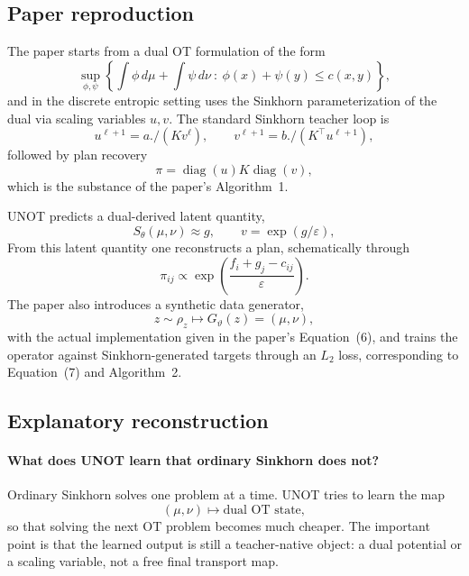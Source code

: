 \documentclass[11pt]{report}
\newcommand{\diag}{\operatorname{diag}}
\begin{document}
\subsection*{Paper reproduction}

The paper starts from a dual OT formulation of the form
\begin{equation}
\sup_{\phi,\psi}
\left\{
\int \phi\,d\mu + \int \psi\,d\nu
\ : \ \phi(x)+\psi(y)\le c(x,y)
\right\},
\label{eq:unot-dual-abstract}
\end{equation}
and in the discrete entropic setting uses the Sinkhorn parameterization of the dual
via scaling variables $u,v$.  The standard Sinkhorn teacher loop is
\begin{equation}
u^{\ell+1} = a ./ (K v^{\ell}),
\qquad
v^{\ell+1} = b ./ (K^{\top}u^{\ell+1}),
\label{eq:unot-sinkhorn}
\end{equation}
followed by plan recovery
\begin{equation}
\pi = \diag(u)K\diag(v),
\label{eq:unot-plan-from-scales}
\end{equation}
which is the substance of the paper's Algorithm~1.

UNOT predicts a dual-derived latent quantity,
\begin{equation}
S_\theta(\mu,\nu)\approx g,
\qquad
v = \exp(g/\varepsilon),
\label{eq:unot-dual-prediction}
\end{equation}
From this latent quantity one reconstructs a plan, schematically through
\begin{equation}
\pi_{ij} \propto \exp\!\left(\frac{f_i+g_j-c_{ij}}{\varepsilon}\right).
\label{eq:unot-plan-recovery}
\end{equation}
The paper also introduces a synthetic data generator,
\begin{equation}
z\sim\rho_z \mapsto G_\vartheta(z)=(\mu,\nu),
\label{eq:unot-generator}
\end{equation}
with the actual implementation given in the paper's Equation~(6), and trains the
operator against Sinkhorn-generated targets through an $L_2$ loss, corresponding
to Equation~(7) and Algorithm~2.

\subsection*{Explanatory reconstruction}

\paragraph{What does UNOT learn that ordinary Sinkhorn does not?}
Ordinary Sinkhorn solves one problem at a time.  UNOT tries to learn the map
\begin{equation}
(\mu,\nu) \longmapsto \text{dual OT state},
\label{eq:unot-learned-map}
\end{equation}
so that solving the next OT problem becomes much cheaper.  The important point is
that the learned output is still a teacher-native object: a dual potential or a
scaling variable, not a free final transport map.
\end{document}

